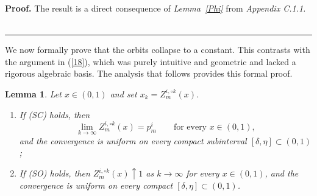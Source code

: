 \documentclass[onecolumn]{article}
\newtheorem{lemma}[theorem]{Lemma}
\newenvironment{proof}[1][Proof]{\noindent\textbf{#1.} }{\ \rule{0.5em}{0.5em}}
\begin{document}
\begin{proof}
The result is a direct consequence of \textit{Lemma~\ref{Phi}} from \textit{%
Appendix C.1.1.}
\end{proof}

We now formally prove that the orbits collapse to a constant. This contrasts
with the argument in (\ref{18}), which was purely intuitive and geometric
and lacked a rigorous algebraic basis. The analysis that follows provides
this formal proof.

\begin{lemma}
\label{Zm-orbits} Let $x\in (0,1)$ and set $x_{k}=Z_{m}^{i,\circ k}(x)$.

\begin{enumerate}
\item If (SC) holds, then 
\begin{equation}
\lim_{k\rightarrow \infty }Z_{m}^{i,\circ k}(x)=p_{m}^{i}\qquad \text{for
every }x\in (0,1),  \label{1022}
\end{equation}%
and the convergence is uniform on every compact subinterval $[\delta ,\eta
]\subset (0,1)$;

\item If (SO) holds, then $Z_{m}^{i,\circ k}(x)\uparrow 1$ as $k\rightarrow
\infty $ for every $x\in (0,1)$, and the convergence is uniform on every
compact $[\delta ,\eta ]\subset (0,1)$.
\end{enumerate}
\end{lemma}
\end{document}
